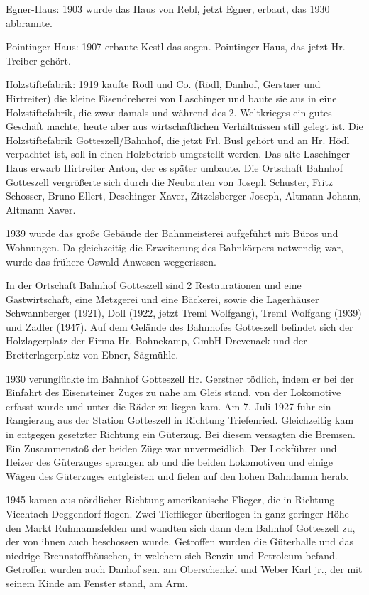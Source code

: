 \documentclass[12pt,a4pager]{book}
\begin{document}
Egner-Haus: 1903 wurde das Haus von Rebl, jetzt Egner, erbaut, das 1930
abbrannte.

Pointinger-Haus: 1907 erbaute Kestl das sogen. Pointinger-Haus, das jetzt Hr.
Treiber gehört.

Holzstiftefabrik: 1919 kaufte Rödl und Co. (Rödl, Danhof, Gerstner und
Hirtreiter) die kleine Eisendreherei von Laschinger und baute sie aus in eine
Holzstiftefabrik, die zwar damals und während des 2. Weltkrieges ein gutes
Geschäft machte, heute aber aus wirtschaftlichen Verhältnissen still gelegt ist.
Die Holzstiftefabrik Gotteszell/Bahnhof, die jetzt Frl. Busl gehört und an Hr.
Hödl verpachtet ist, soll in einen Holzbetrieb umgestellt werden. Das alte
Laschinger-Haus erwarb Hirtreiter Anton, der es später umbaute. Die Ortschaft
Bahnhof Gotteszell vergrößerte sich durch die Neubauten von Joseph Schuster,
Fritz Schosser, Bruno Ellert, Deschinger Xaver, Zitzelsberger Joseph, Altmann
Johann, Altmann Xaver.

1939 wurde das große Gebäude der Bahnmeisterei aufgeführt mit Büros und
Wohnungen. Da gleichzeitig die Erweiterung des Bahnkörpers notwendig war, wurde
das frühere Oswald-Anwesen weggerissen.

In der Ortschaft Bahnhof Gotteszell sind 2 Restaurationen und eine
Gastwirtschaft, eine Metzgerei und eine Bäckerei, sowie die Lagerhäuser
Schwannberger (1921), Doll (1922, jetzt Treml Wolfgang), Treml Wolfgang (1939)
und Zadler (1947). Auf dem Gelände des Bahnhofes Gotteszell befindet sich der
Holzlagerplatz der Firma Hr. Bohnekamp, GmbH Drevenack und der Bretterlagerplatz
von Ebner, Sägmühle.

1930 verunglückte im Bahnhof Gotteszell Hr. Gerstner tödlich, indem er bei der
Einfahrt des Eisensteiner Zuges zu nahe am Gleis stand, von der Lokomotive
erfasst wurde und unter die Räder zu liegen kam. Am 7. Juli 1927 fuhr ein
Rangierzug aus der Station Gotteszell in Richtung Triefenried. Gleichzeitig kam
in entgegen gesetzter Richtung ein Güterzug. Bei diesem versagten die Bremsen.
Ein Zusammenstoß der beiden Züge war unvermeidlich. Der Lockführer und Heizer
des Güterzuges sprangen ab und die beiden Lokomotiven und einige Wägen des
Güterzuges entgleisten und fielen auf den hohen Bahndamm herab.

1945 kamen aus nördlicher Richtung amerikanische Flieger, die in Richtung
Viechtach-Deggendorf flogen. Zwei Tiefflieger überflogen in ganz geringer Höhe
den Markt Ruhmannsfelden und wandten sich dann dem Bahnhof Gotteszell zu, der
von ihnen auch beschossen wurde. Getroffen wurden die Güterhalle und das
niedrige Brennstoffhäuschen, in welchem sich Benzin und Petroleum befand.
Getroffen wurden auch Danhof sen. am Oberschenkel und Weber Karl jr., der mit
seinem Kinde am Fenster stand, am Arm.
\end{document}
